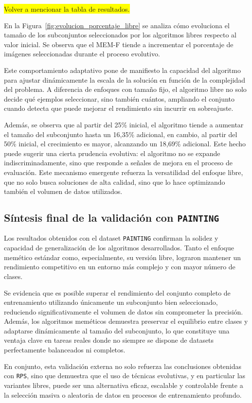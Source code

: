 \colorbox{yellow}{Volver a mencionar la tabla de resultados.}

En la Figura~\ref{fig:evolucion_porcentaje_libre} se analiza cómo evoluciona el tamaño de los subconjuntos seleccionados por los algoritmos libres respecto al valor inicial.
Se observa que el MEM-F tiende a incrementar el porcentaje de imágenes seleccionadas durante el proceso evolutivo.

Este comportamiento adaptativo pone de manifiesto la capacidad del algoritmo para ajustar dinámicamente la escala de la solución en función de la complejidad del problema.
A diferencia de enfoques con tamaño fijo, el algoritmo libre no solo decide qué ejemplos seleccionar, sino también cuántos,
ampliando el conjunto cuando detecta que puede mejorar el rendimiento sin incurrir en sobreajuste.

Además, se observa que al partir del 25\% inicial, el algoritmo tiende a aumentar el tamaño del subconjunto hasta un 16,35\% adicional,
en cambio, al partir del 50\% inicial, el crecimiento es mayor, alcanzando un 18,69\% adicional.
Este hecho puede sugerir una cierta prudencia evolutiva: el algoritmo no se expande indiscriminadamente,
sino que responde a señales de mejora en el proceso de evaluación.
Este mecanismo emergente refuerza la versatilidad del enfoque libre, que no solo busca soluciones de alta calidad,
sino que lo hace optimizando también el volumen de datos utilizados.


\bigskip

\subsection*{Síntesis final de la validación con \texttt{PAINTING}}
Los resultados obtenidos con el dataset \texttt{PAINTING} confirman la solidez y capacidad de generalización de los algoritmos desarrollados.
Tanto el enfoque memético estándar como, especialmente, su versión libre, lograron mantener un rendimiento competitivo en un entorno más complejo y con mayor número de clases.

Se evidencia que es posible superar el rendimiento del conjunto completo de entrenamiento utilizando únicamente un subconjunto bien seleccionado,
reduciendo significativamente el volumen de datos sin comprometer la precisión.
Además, los algoritmos meméticos demuestra preservar el equilibrio entre clases y adaptarse dinámicamente al tamaño del subconjunto,
lo que constituye una ventaja clave en tareas reales donde no siempre se dispone de datasets perfectamente balanceados ni completos.

En conjunto, esta validación externa no solo refuerza las conclusiones obtenidas con \texttt{RPS},
sino que demuestra que el uso de técnicas evolutivas, y en particular las variantes libres, puede ser una alternativa eficaz,
escalable y controlable frente a la selección masiva o aleatoria de datos en procesos de entrenamiento profundo.
